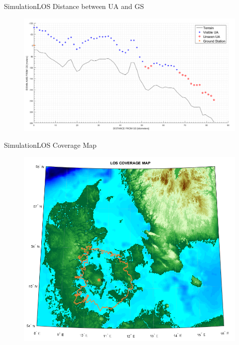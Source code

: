 \begin{frame}{Simulation}{LOS Distance between UA and GS} 
  	\begin{figure}
        \includegraphics[scale=0.29]{../report/figures/los_2points.png}
    \end{figure}
\end{frame}

\begin{frame}{Simulation}{LOS Coverage Map} 
  	\begin{figure}
        \includegraphics[scale=0.40]{../report/figures/los_odense.png}
    \end{figure}
\end{frame}

